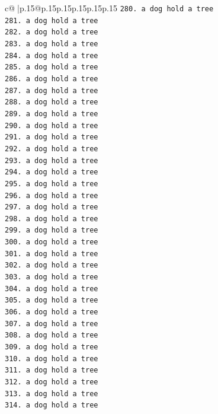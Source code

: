 \documentclass{article}
\begin{document}
{\begin{supertabular}{c@{$\;$}|p{.15\linewidth}@{}p{.15\linewidth}p{.15\linewidth}p{.15\linewidth}p{.15\linewidth}p{.15\linewidth}}
{{{\texttt{280. a dog hold a tree} \\
\texttt{281. a dog hold a tree} \\
\texttt{282. a dog hold a tree} \\
\texttt{283. a dog hold a tree} \\
\texttt{284. a dog hold a tree} \\
\texttt{285. a dog hold a tree} \\
\texttt{286. a dog hold a tree} \\
\texttt{287. a dog hold a tree} \\
\texttt{288. a dog hold a tree} \\
\texttt{289. a dog hold a tree} \\
\texttt{290. a dog hold a tree} \\
\texttt{291. a dog hold a tree} \\
\texttt{292. a dog hold a tree} \\
\texttt{293. a dog hold a tree} \\
\texttt{294. a dog hold a tree} \\
\texttt{295. a dog hold a tree} \\
\texttt{296. a dog hold a tree} \\
\texttt{297. a dog hold a tree} \\
\texttt{298. a dog hold a tree} \\
\texttt{299. a dog hold a tree} \\
\texttt{300. a dog hold a tree} \\
\texttt{301. a dog hold a tree} \\
\texttt{302. a dog hold a tree} \\
\texttt{303. a dog hold a tree} \\
\texttt{304. a dog hold a tree} \\
\texttt{305. a dog hold a tree} \\
\texttt{306. a dog hold a tree} \\
\texttt{307. a dog hold a tree} \\
\texttt{308. a dog hold a tree} \\
\texttt{309. a dog hold a tree} \\
\texttt{310. a dog hold a tree} \\
\texttt{311. a dog hold a tree} \\
\texttt{312. a dog hold a tree} \\
\texttt{313. a dog hold a tree} \\
\texttt{314. a dog hold a tree} \\
}}}
\end{supertabular}}
\end{document}
